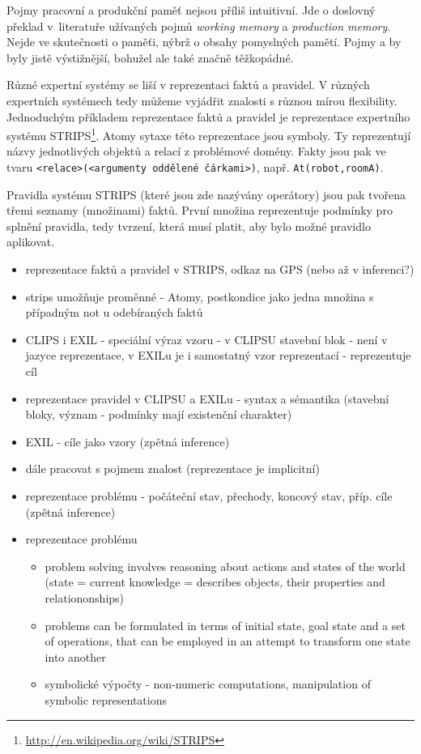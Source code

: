 Pojmy pracovní a produkční paměť nejsou příliš intuitivní. Jde o doslovný
překlad v~literatuře užívaných pojmů \emph{working memory} a \emph{production
memory}. Nejde ve skutečnosti o paměťi, nýbrž o obsahy pomyslných pamětí. Pojmy
 a  by byly jistě
výstižnější, bohužel ale také značně těžkopádné.

Různé expertní systémy se liší v reprezentaci faktů a pravidel. V různých
expertních systémech tedy můžeme vyjádřit znalosti s různou mírou flexibility.
Jednoduchým příkladem reprezentace faktů a pravidel je reprezentace expertního
systému STRIPS\footnote{\url{http://en.wikipedia.org/wiki/STRIPS}}. Atomy sytaxe
této reprezentace jsou symboly. Ty reprezentují názvy jednotlivých objektů a
relací z problémové domény. Fakty jsou pak ve tvaru
\verb|<relace>(<argumenty oddělené čárkami>)|, např. \verb|At(robot,roomA)|.

Pravidla systému STRIPS (které jsou zde nazývány operátory) jsou pak tvořena
třemi seznamy (množinami) faktů. První množina reprezentuje podmínky pro splnění
pravidla, tedy tvrzení, která musí platit, aby bylo možné pravidlo aplikovat.

\begin{framed}
  \begin{itemize}
    \item reprezentace faktů a pravidel v STRIPS, odkaz na GPS (nebo až v
      inferenci?)
    \item strips umožňuje proměnné - Atomy, postkondice jako jedna množina s
      případným not u odebíraných faktů
    \item CLIPS i EXIL - speciální výraz vzoru - v CLIPSU stavební blok - není
      v jazyce reprezentace, v EXILu je i samostatný vzor reprezentací -
      reprezentuje cíl
    \item reprezentace pravidel v CLIPSU a EXILu - syntax a sémantika
      (stavební bloky, význam - podmínky mají existenční charakter)
    \item EXIL - cíle jako vzory (zpětná inference)
    \item dále pracovat s pojmem znalost (reprezentace je implicitní)
    \item reprezentace problému - počáteční stav, přechody, koncový stav,
      příp. cíle (zpětná inference)
    \item reprezentace problému
      \begin{itemize}
        \item problem solving involves reasoning about actions and states of the
          world (state = current knowledge = describes objects, their properties and
          relationonships)
        \item problems can be formulated in terms of initial state, goal state
          and a set of operations, that can be employed in an attempt to
          transform one state into another
        \item symbolické výpočty - non-numeric computations, manipulation of
          symbolic representations
      \end{itemize}
  \end{itemize}
\end{framed}
